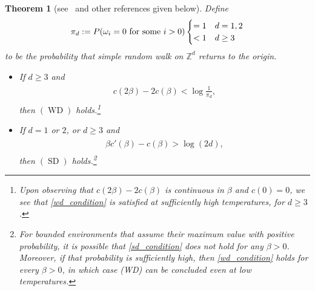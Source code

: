 \documentclass[11pt,reqno]{amsart}
\numberwithin{equation}{section}
\newtheorem{thm}{Theorem}[section]
\theoremstyle{definition}
\begin{document}
\begin{thm}[see~\cite{comets-shiga-yoshida04, denHollander09} and other references given below] \label{original_characterization}
Define
{\begin{align*} {
\pi_d := P(\omega_i = 0 \textup{ for some } i > 0) \begin{cases}
= 1 &d = 1,2 \\
< 1 &d \geq 3
\end{cases}
} \end{align*}}
to be the probability that simple random walk on ${\mathbb{Z}}^d$ returns to the origin. 
\begin{itemize}
\item[(a)] If $d \geq 3$ and
{\begin{align} \begin{split} {
c(2\beta) - 2c(\beta) < \log \frac{1}{\pi_d}, \label{wd_condition}
} \end{split} \end{align}}
then $(\operatorname{WD})$ holds.\footnote{Upon observing that $c(2\beta) - 2c(\beta)$ is continuous in $\beta$ and $c(0) = 0$, we see that \eqref{wd_condition} is satisfied at sufficiently high temperatures, for $d \geq 3$.}
\item[(b)] If $d = 1$ or $2$, or $d \geq 3$ and
{\begin{align} \begin{split} {
\beta c'(\beta) - c(\beta) > \log(2d), \label{sd_condition}
} \end{split} \end{align}}
then $(\operatorname{SD})$ holds.\footnote{For bounded environments that assume their maximum value with positive probability, it is possible that \eqref{sd_condition} does not hold for any $\beta > 0$.
Moreover, if that probability is sufficiently high, then \eqref{wd_condition} holds for every $\beta > 0$, in which case (WD) can be concluded even at low temperatures.}
\end{itemize}
\end{thm}
\end{document}
